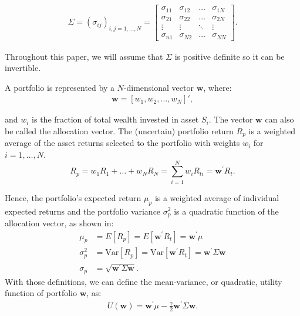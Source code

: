 \documentclass[12pt,oneside,a4paper]{memoir}
\begin{document}
\vspace{-12pt}
\begin{align*}
\Sigma = ( \sigma_{ij} )_{i,j=1,\dots,N} = 
	\begin{bmatrix}
	\sigma_{11} & \sigma_{12} & \dots & \sigma_{1N}
	\\
	\sigma_{21} & \sigma_{22} & \dots & \sigma_{2N}
	\\
	\vdots           & \vdots            & \ddots & \vdots
	\\
	\sigma_{n1} & \sigma_{N2} & \dots & \sigma_{NN}
\end{bmatrix}.
\end{align*}

\noindent
Throughout this paper, we will assume that $\Sigma$ is positive definite so it can be invertible.

A portfolio is represented by a $N$-dimensional vector $\mathbf{w}$, where:
\begin{align*}
	\mathbf{w} = \left[ w_1, w_2 , \dots, w_N \right]',
\end{align*}

\noindent
and $w_{i}$ is the fraction of total wealth invested in asset $S_{i}$. The vector $\mathbf{w}$ can also be called the allocation vector. The (uncertain) portfolio return $R_{p}$ is a weighted average of the asset returns selected to the portfolio with weights $w_{i}$ for $i=1,\dots,N$.
\begin{equation} \label{ret_port}
R_p = w_1 R_1 + \dots + w_N R_N = \sum_{i=1}^{N} w_i R_{ti} = \mathbf{w}^{\prime}R_{t}.
\end{equation}

Hence, the portfolio's expected return $\mu_{p}$ is a weighted average of individual expected returns and the portfolio variance $\sigma^{2}_{p}$ is a quadratic function of the allocation vector, as shown in:
\begin{align}
	\mu_p &= E[R_p] = E[ \mathbf{w}^{\prime}R_{t} ] = \mathbf{w}^{\prime}\mu \\
	\sigma_p^2 &= \mathrm{Var}[R_p] = \mathrm{Var}[\mathbf{w}^{\prime} R_{t}] = \mathbf{w}^{\prime}\Sigma \mathbf{w} \\
	\sigma_p &=  \sqrt{\mathbf{w}^{\prime}\Sigma \mathbf{w}}.
\end{align}
With those definitions, we can define the mean-variance, or quadratic, utility function of portfolio $\mathbf{w}$, as:
\begin{align}
\label{mv:util}
U(\mathbf{w}) = \mathbf{w}^{\prime} \mu - \frac{\gamma}{2} \mathbf{w}^{\prime} \Sigma \mathbf{w}.
\end{align}
\end{document}
